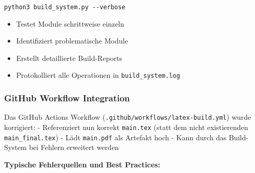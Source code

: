 \begin{verbatim}
python3 build_system.py --verbose
\end{verbatim}

\begin{itemize}
\tightlist
\item
  Testet Module schrittweise einzeln
\item
  Identifiziert problematische Module
\item
  Erstellt detaillierte Build-Reports
\item
  Protokolliert alle Operationen in \texttt{build\_system.log}
\end{itemize}

\hypertarget{github-workflow-integration}{%
\subsubsection{GitHub Workflow Integration}\label{github-workflow-integration}}

Das GitHub Actions Workflow (\texttt{.github/workflows/latex-build.yml}) wurde korrigiert: - Referenziert nun korrekt \texttt{main.tex} (statt dem nicht existierenden \texttt{main\_final.tex}) - Lädt \texttt{main.pdf} als Artefakt hoch - Kann durch das Build-System bei Fehlern erweitert werden

\textbf{Typische Fehlerquellen und Best Practices:}

